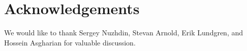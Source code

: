 \documentclass{article}
\newcommand{\plr}[1]{\todo[color=blue!25]{#1}}
\newcommand{\plr}[1]{{\color{blue}\it #1}}
\newcommand{\jss}[1]{{\color{olive}\it #1}}
\newcommand{\1}{\mathbbm{1}}
\begin{document}
%

\section*{Acknowledgements}
We would like to thank Sergey Nuzhdin, Stevan Arnold, Erik Lundgren, and Hossein Asgharian for valuable discussion.




\normalsize
\end{document}
